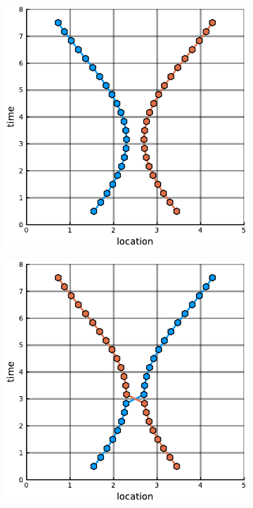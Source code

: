 \documentclass[12pt]{article}
\theoremstyle{definition}
\begin{document}
\begin{figure}
    \begin{subfigure}[t]{0.45\textwidth}
      \includegraphics[width=\textwidth]{jumps-2a.pdf}
      \caption{}
      \label{fig:jumps-2a}
    \end{subfigure}
    \begin{subfigure}[t]{0.45\textwidth}
      \includegraphics[width=\textwidth]{jumps-2b.pdf}

\end{subfigure}
\end{figure}
\end{document}
